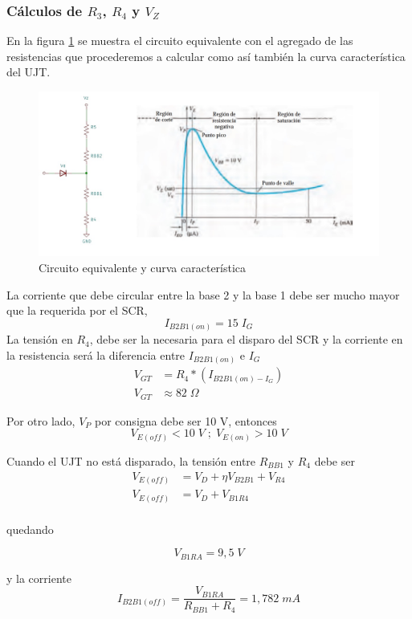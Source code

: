 \documentclass{article}
\begin{document}
\subsubsection{Cálculos de $R_3$, $R_4$ y $V_Z$}
En la figura \textcolor{blue}{\ref{fig:fig3}} se muestra el circuito equivalente con el agregado de las resistencias que procederemos a calcular como así también la curva característica del UJT.
%
\begin{figure}[h]
 \begin{center}
	\includegraphics[width=\textwidth]{imagenes/fig3.jpg} 
	\caption{Circuito equivalente y curva característica}\label{fig:fig3}
 \end{center}
\end{figure}
%
La corriente que debe circular entre la base 2 y la base 1 debe ser mucho mayor que la requerida por el SCR, 
\[ I_{B2B1(on)} = 15 \; I_G \]
La tensión en $R_4$, debe ser la necesaria para el disparo del SCR y la corriente en la resistencia será la diferencia entre $I_{B2B1(on)}$ e $I_G$
\begin{align*}
V_{GT} &= R_4 * (I_{B2B1(on) - I_G}) \\
V_{GT} &\approx 82 \; \Omega  
\end{align*}

Por otro lado, $V_P$ por consigna debe ser 10 V, entonces
\[V_{E(off)} < 10 \; V \; ; \; V_{E(on)} > 10 \; V\]

Cuando el UJT no está disparado, la tensión entre $R_{BB1}$ y $R_4$ debe ser
\begin{align*}
V_{E(off)} &= V_D + \eta V_{B2B1} + V_{R4} \\
V_{E(off)} &= V_D + V_{B1R4}\\
\end{align*}

quedando

\[ V_{B1RA} = 9,5 \; V \]

y la corriente 
\[ I_{B2B1(off)} = \frac{V_{B1RA}}{R_{BB1} + R_4} = 1,782 \; mA \]
\end{document}
